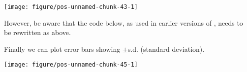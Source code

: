 \documentclass[paper=a4,10pt,div=17,headsepline,BCOR=12mm,twoside,open=right]{scrbook}\usepackage{knitr}
\begin{document}
\begin{knitrout}\footnotesize
{}\color{fgcolor}\begin{kframe}
\begin{alltt}
 \hlopt{+} \hlstd{(} \hlstd{=} \hlstd{,}  \hlstd{=} \hlstd{(} \hlstd{=} \hlstd{),}
                    \hlstd{=}\hlstd{,} \hlstd{=}\hlstd{,} \hlstd{=}\hlstd{)}
\end{alltt}
\end{kframe}

{\centering \texttt{[image: figure/pos-unnamed-chunk-43-1]} 

}



\end{knitrout}

However, be aware that the code below, as used in earlier versions of \ggplot, needs to be rewritten as above.

\begin{knitrout}\footnotesize
{}\color{fgcolor}\begin{kframe}
\begin{alltt}
 \hlopt{+} \hlstd{(} \hlstd{=} \hlstd{,}  \hlstd{=} \hlstd{,}
                    \hlstd{=}\hlstd{,} \hlstd{=}\hlstd{,} \hlstd{=}\hlstd{)}
\end{alltt}
\end{kframe}
\end{knitrout}

Finally we can plot error bars showing $\pm$s.d. (standard deviation).

\begin{knitrout}\footnotesize
{}\color{fgcolor}\begin{kframe}
\begin{alltt}
 \hlopt{+} \hlstd{(} \hlstd{=} \hlstd{,}
                    \hlstd{=}\hlstd{,} \hlstd{=}\hlstd{,} \hlstd{=}\hlstd{)}
\end{alltt}
\end{kframe}

{\centering \texttt{[image: figure/pos-unnamed-chunk-45-1]} 

}



\end{knitrout}
\end{document}
